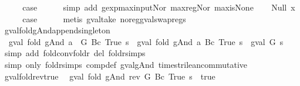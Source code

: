 \begin{isabellebody}
\ \ \isamarkupfalse%
\ \isamarkupfalse%
\ {\isacharquery}case\isanewline
\ \ \ \ \isamarkupfalse%
\ {\isacharparenleft}simp\ add{\isacharcolon}\ gexp{\isacharunderscore}max{\isacharunderscore}input{\isacharunderscore}Nor\ max{\isacharunderscore}reg{\isacharunderscore}Nor\ max{\isacharunderscore}is{\isacharunderscore}None{\isacharparenright}\isanewline
{}\isamarkupfalse%
\isanewline
\ \ \isamarkupfalse%
\ {\isacharparenleft}Null\ x{\isacharparenright}\isanewline
\ \ \isamarkupfalse%
\ \isamarkupfalse%
\ {\isacharquery}case\isanewline
\ \ \ \ \isamarkupfalse%
\ {\isacharparenleft}metis\ gval{\isacharunderscore}take\ no{\isacharunderscore}reg{\isacharunderscore}gval{\isacharunderscore}swap{\isacharunderscore}regs{\isacharparenright}\isanewline
{}\isamarkupfalse%
%
\endisatagproof
{\isafoldproof}%
%
\isadelimproof
\isanewline
%
\endisadelimproof
\isanewline
{}\isamarkupfalse%
\ gval{\isacharunderscore}fold{\isacharunderscore}gAnd{\isacharunderscore}append{\isacharunderscore}singleton{\isacharcolon}\isanewline
\ \ {\isachardoublequoteopen}gval\ {\isacharparenleft}fold\ gAnd\ {\isacharparenleft}a\ {\isacharat}\ {\isacharbrackleft}G{\isacharbrackright}{\isacharparenright}\ {\isacharparenleft}Bc\ True{\isacharparenright}{\isacharparenright}\ s\ {\isacharequal}\ gval\ {\isacharparenleft}fold\ gAnd\ a\ {\isacharparenleft}Bc\ True{\isacharparenright}{\isacharparenright}\ s\ {\isasymand}\isactrlsub {\isacharquery}\ gval\ G\ s{\isachardoublequoteclose}\isanewline
%
\isadelimproof
\ \ %
\endisadelimproof
%
\isatagproof
{}\isamarkupfalse%
\ {\isacharparenleft}simp\ add{\isacharcolon}\ fold{\isacharunderscore}conv{\isacharunderscore}foldr\ del{\isacharcolon}\ foldr{\isachardot}simps{\isacharparenright}\isanewline
\ \ \isamarkupfalse%
\ {\isacharparenleft}simp\ only{\isacharcolon}\ foldr{\isachardot}simps\ comp{\isacharunderscore}def\ gval{\isacharunderscore}gAnd\ times{\isacharunderscore}trilean{\isacharunderscore}commutative{\isacharparenright}%
\endisatagproof
{\isafoldproof}%
%
\isadelimproof
\isanewline
%
\endisadelimproof
\isanewline
{}\isamarkupfalse%
\ gval{\isacharunderscore}fold{\isacharunderscore}rev{\isacharunderscore}true{\isacharcolon}\isanewline
\ \ {\isachardoublequoteopen}gval\ {\isacharparenleft}fold\ gAnd\ {\isacharparenleft}rev\ G{\isacharparenright}\ {\isacharparenleft}Bc\ True{\isacharparenright}{\isacharparenright}\ s\ {\isacharequal}\ true\ {\isasymLongrightarrow}\isanewline

\end{isabellebody}
